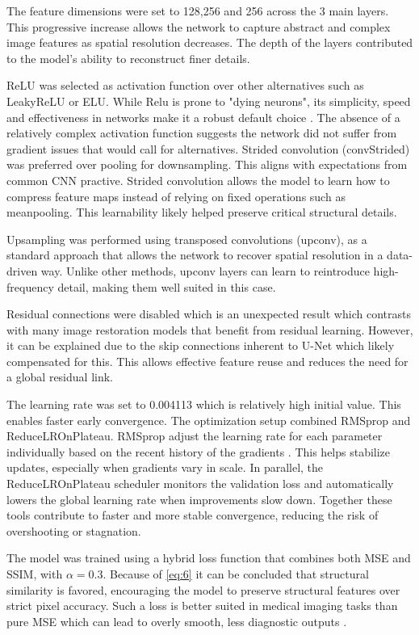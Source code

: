 \documentclass[twocolumn]{article}
\begin{document}
The feature dimensions were set to 128,256 and 256 across the 3 main layers. 
This progressive increase allows the network to capture abstract and complex image features as spatial resolution decreases. 
The depth of the layers contributed to the model's ability to reconstruct finer details.

ReLU was selected as activation function over other alternatives such as LeakyReLU or ELU. 
While Relu is prone to "dying neurons", its simplicity, speed and effectiveness in networks make it a robust default choice \cite{relu}. 
The absence of a relatively complex activation function suggests the network did not suffer from gradient issues that would call for alternatives. 
Strided convolution (convStrided) was preferred over pooling for downsampling. 
This aligns with expectations from common CNN practive. 
Strided convolution allows the model to learn how to compress feature maps instead of relying on fixed operations such as meanpooling. 
This learnability likely helped preserve critical structural details. 

Upsampling was performed using transposed convolutions (upconv), as a standard approach that allows the network to recover spatial resolution in a data-driven way. 
Unlike other methods, upconv layers can learn to reintroduce high-frequency detail, making them well suited in this case.

Residual connections were disabled which is an unexpected result which contrasts with many image restoration models that benefit from residual learning. 
However, it can be explained due to the skip connections inherent to U-Net which likely compensated for this. 
This allows effective feature reuse and reduces the need for a global residual link.

The learning rate was set to 0.004113 which is relatively high initial value. This enables faster early convergence. 
The optimization setup combined RMSprop and ReduceLROnPlateau. 
RMSprop adjust the learning rate for each parameter individually based on the recent history of the gradients \cite{9036442}. 
This helps stabilize updates, especially when gradients vary in scale. 
In parallel, the ReduceLROnPlateau scheduler monitors the validation loss and automatically lowers the global learning rate when improvements slow down. 
Together these tools contribute to faster and more stable convergence, reducing the risk of overshooting or stagnation.

The model was trained using a hybrid loss function that combines both MSE and SSIM, with  $\alpha=0.3$. 
Because of \ref{eq:6} it can be concluded that structural similarity is favored, encouraging the model to preserve structural features over strict pixel accuracy. 
Such a loss is better suited in medical imaging tasks than pure MSE which can lead to overly smooth, less diagnostic outputs \cite{Dastmalchi}. 
\end{document}
